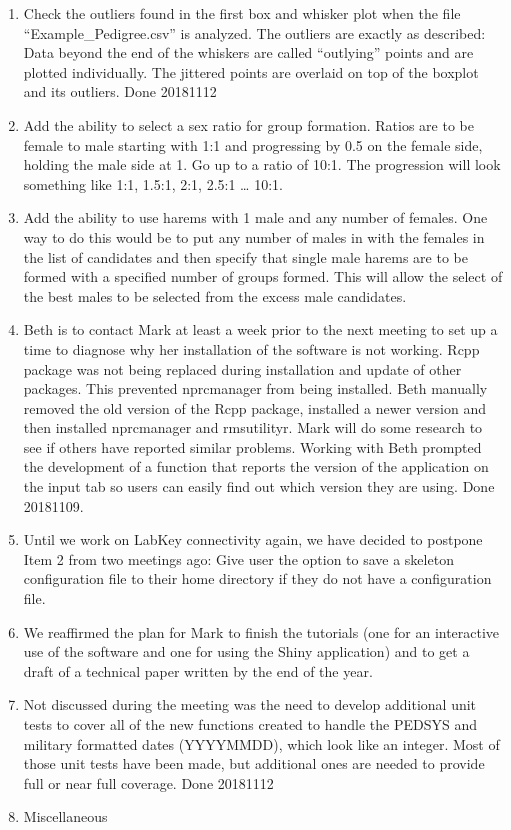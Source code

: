 \documentclass[
]{article}
\providecommand{\tightlist}{%
  \setlength{\itemsep}{0pt}\setlength{\parskip}{0pt}}
\begin{document}
\begin{enumerate}
\def\labelenumi{\arabic{enumi}.}
\setcounter{enumi}{2}
\tightlist
\item
  Check the outliers found in the first box and whisker plot when the
  file ``Example\_Pedigree.csv'' is analyzed. The outliers are exactly
  as described: Data beyond the end of the whiskers are called
  ``outlying'' points and are plotted individually. The jittered points
  are overlaid on top of the boxplot and its outliers. Done 20181112
\item
  Add the ability to select a sex ratio for group formation. Ratios are
  to be female to male starting with 1:1 and progressing by 0.5 on the
  female side, holding the male side at 1. Go up to a ratio of 10:1. The
  progression will look something like 1:1, 1.5:1, 2:1, 2.5:1 \ldots{}
  10:1.
\item
  Add the ability to use harems with 1 male and any number of females.
  One way to do this would be to put any number of males in with the
  females in the list of candidates and then specify that single male
  harems are to be formed with a specified number of groups formed. This
  will allow the select of the best males to be selected from the excess
  male candidates.
\item
  Beth is to contact Mark at least a week prior to the next meeting to
  set up a time to diagnose why her installation of the software is not
  working. Rcpp package was not being replaced during installation and
  update of other packages. This prevented nprcmanager from being
  installed. Beth manually removed the old version of the Rcpp package,
  installed a newer version and then installed nprcmanager and
  rmsutilityr. Mark will do some research to see if others have reported
  similar problems. Working with Beth prompted the development of a
  function that reports the version of the application on the input tab
  so users can easily find out which version they are using. Done
  20181109.
\item
  Until we work on LabKey connectivity again, we have decided to
  postpone Item 2 from two meetings ago: Give user the option to save a
  skeleton configuration file to their home directory if they do not
  have a configuration file.
\item
  We reaffirmed the plan for Mark to finish the tutorials (one for an
  interactive use of the software and one for using the Shiny
  application) and to get a draft of a technical paper written by the
  end of the year.
\item
  Not discussed during the meeting was the need to develop additional
  unit tests to cover all of the new functions created to handle the
  PEDSYS and military formatted dates (YYYYMMDD), which look like an
  integer. Most of those unit tests have been made, but additional ones
  are needed to provide full or near full coverage. Done 20181112
\item
  Miscellaneous
\end{enumerate}
\end{document}
